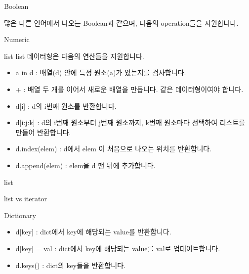 \documentclass{beamer}
\begin{document}
\begin{frame}[fragile]{Boolean}

많은 다른 언어에서 나오는 Boolean과 같으며, 다음의 operation들을 지원합니다. 


\end{frame}

\begin{frame}[fragile]{Numeric}

\end{frame}

\begin{frame}[fragile]{list}
list 데이터형은 다음의 연산들을 지원합니다. 
\begin{itemize} 
\item a in d : 배열(d) 안에 특정 원소(a)가 있는지를 검사합니다. 
\item + : 배열 두 개를 이어서 새로운 배열을 만듭니다. 같은 데이터형이여야 합니다. 
\item d[i] : d의 i번째 원소를 반환합니다. 
\item d[i:j:k] : d의 i번째 원소부터 j번째 원소까지, k번째 원소마다 선택하여 리스트를 만들어 반환합니다. 
\item d.index(elem) : d에서 elem 이 처음으로 나오는 위치를 반환합니다. 
\item d.append(elem) : elem을 d 맨 뒤에 추가합니다. 
\end{itemize}

\end{frame}
\begin{frame}[fragile]{list}


\end{frame}

\begin{frame}[fragile]{list vs iterator}
\end{frame}


\begin{frame}[fragile]{Dictionary}
\begin{itemize} 
\item d[key] : dict에서 key에 해당되는 value를 반환합니다. 
\item d[key] = val : dict에서 key에 해당되는 value를 val로 업데이트합니다. 
\item d.keys() : dict의 key들을 반환합니다. 
\end{itemize}



\end{frame}
\end{document}
